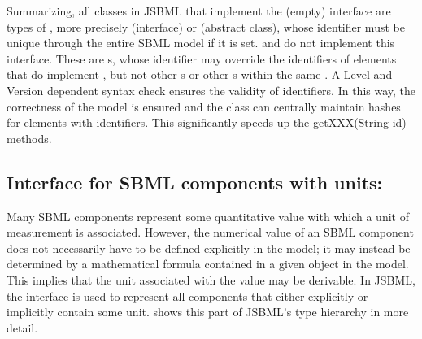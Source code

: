 Summarizing, all classes in JSBML that implement the (empty) interface
\UniqueNamedSBase are types of \SBase, more precisely \NamedSBase (interface)
or \AbstractNamedSBase (abstract class), whose identifier must be unique through
the entire SBML model if it is set. \UnitDefinition and \LocalParameter do not
implement this interface. These are {\NamedSBase}s, whose identifier may
override the identifiers of elements that do implement \UniqueNamedSBase, but
not other {\UnitDefinition}s or other {\LocalParameter}s within the same
\KineticLaw. A Level and Version dependent syntax check ensures the validity of
identifiers. In this way, the correctness of the model is ensured and the \Model
class can centrally maintain hashes for elements with identifiers. This
significantly speeds up the getXXX(String id) methods.


\subsection{Interface for SBML components with units: }

Many SBML components represent some quantitative value with which a unit of
measurement is associated. However, the numerical value of an SBML
component does not necessarily have to be defined explicitly in the model;
it may instead be determined by a mathematical formula contained in a given
\SBase object in the model.  This implies that the unit associated with the
value may be derivable.  In JSBML, the interface \SBaseWithDerivedUnit is
used to represent all components that either explicitly or implicitly
contain some unit.   shows this part of JSBML's
type hierarchy in more detail.

